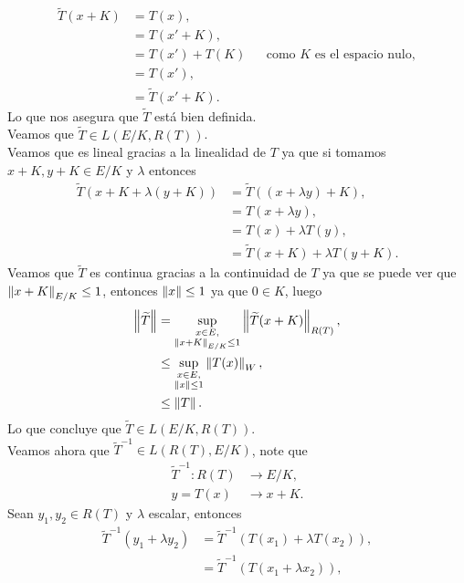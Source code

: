 \begin{homeworkProblem}
\begin{solution}
\begin{enumerate}[(i)]
\begin{enumerate}[(a)]
          \begin{align*}
            \tilde{T}(x+K)&=T(x),\\
            &=T(x'+K),\\
            &=T(x')+T(K) &&\text{como $K$ es el espacio nulo},\\
            &=T(x'),\\
            &=\tilde{T}(x'+K).
          \end{align*}
          Lo que nos asegura que $\tilde{T}$ está bien definida.\\
          Veamos que $\tilde{T}\in L(E/K,R(T))$.\\
          Veamos que es lineal gracias a la linealidad de $T$ ya que si tomamos $x+K,y+K\in E/K$ y $\lambda$ entonces
          \begin{align*}
            \tilde{T}(x+K+\lambda(y+K))&=\tilde{T}((x+\lambda y)+K),\\
            &=T(x+\lambda y),\\
            &=T(x)+\lambda T(y),\\
            &=\tilde{T}(x+K)+\lambda T(y+K).
          \end{align*}
          Veamos que $\tilde{T}$ es continua gracias a la continuidad de $T$ ya que se puede ver que $\left\|x+K\right\|_{E/K}\leq 1$, entonces $\left\|x\right\|\leq 1$ ya que $0\in K$, luego 
          \begin{align*}
            \left\|\widetilde{T}\right\|&=\sup_{\substack{x\in E,\\\left\|x+K\right\|_{E/K}\leq 1}}\left\|\widetilde{T}(x+K)\right\|_{R(T)},\\
            &\leq \sup_{\substack{x\in E,\\ \left\|x\right\|\leq 1}}\left\|T(x)\right\|_{W},\\
            &\leq \left\|T\right\|.
          \end{align*}
          Lo que concluye que $\tilde{T}\in L(E/K,R(T))$.\\
          Veamos ahora que $\tilde{T}^{-1}\in L(R(T),E/K)$, note que
          \begin{align*}
            \tilde{T}^{-1}:R(T)&\to E/K,\\
            y=T(x)&\to x+K.
          \end{align*}
          Sean $y_1,y_2\in R(T)$ y $\lambda$ escalar, entonces
          \begin{align*}
            \tilde{T}^{-1}(y_1+\lambda y_{2})&=\tilde{T}^{-1}\left( T(x_1)+\lambda T(x_2) \right),\\
            &=\tilde{T}^{-1}(T(x_1+\lambda x_2)),\\

\end{align*}
\end{enumerate}
\end{enumerate}
\end{solution}
\end{homeworkProblem}
